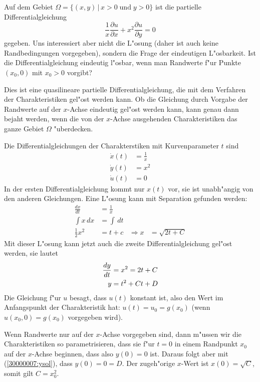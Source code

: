 Auf dem Gebiet $\Omega = \{ (x,y)\,|\, x>0\;\text{und}\;y > 0\}$
ist die partielle Differentialgleichung
\begin{equation}
\frac1x\frac{\partial u}{\partial x}+x^2\frac{\partial u}{\partial y}=0
\label{30000007:pdgl}
\end{equation}
gegeben. Uns interessiert aber nicht die L"osung (daher ist auch keine
Randbedingungen vorgegeben), sondern die Frage der eindeutigen L"osbarkeit.
Ist die Differentialgleichung eindeutig l"osbar, wenn man Randwerte 
f"ur Punkte $(x_0,0)$ mit $x_0>0$ vorgibt?

\begin{loesung}
Dies ist eine quasilineare partielle Differentialgleichung, die mit
dem Verfahren der Charakteristiken gel"ost werden kann. Ob die Gleichung
durch Vorgabe der Randwerte auf der $x$-Achse eindeutig gel"ost werden
kann, kann genau dann bejaht werden, wenn die von der $x$-Achse
ausgehenden Charakteristiken das ganze Gebiet $\Omega$
"uberdecken.

Die Differentialgleichungen der Charakterstiken mit Kurvenparameter $t$ sind 
\begin{align*}
\dot x(t)&=\frac1x\\
\dot y(t)&=x^2\\
\dot u(t)&=0
\end{align*}
In der ersten Differentialgleichung kommt nur $x(t)$ vor, sie ist unabh"angig
von den anderen Gleichungen. Eine L"osung kann mit Separation gefunden werden:
\begin{align*}
\frac{dx}{dt}&=\frac1x\\
\int x\,dx&=\int \,dt\\
\frac12x^2&= t + c&\Rightarrow x&=\sqrt{2t + C}
\end{align*}
Mit dieser L"osung kann jetzt auch die zweite Differentialgleichung
gel"ost werden, sie lautet
\begin{align}
\frac{dy}{dt}&=x^2=2t+C \notag \\
y&=t^2+Ct + D \label{30000007:ysol}
\end{align}
Die Gleichung f"ur $u$ besagt, dass $u(t)$ konstant ist, also den
Wert im Anfangspunkt der Charakteristik hat: $u(t)=u_0=g(x_0)$ (wenn
$u(x_0,0)=g(x_0)$ vorgegeben wird).

Wenn Randwerte nur auf der $x$-Achse vorgegeben sind, dann m"ussen
wir die Charakteristiken so parametrisieren, dass sie f"ur $t=0$
in einem Randpunkt $x_0$ auf der $x$-Achse beginnen, dass also
$y(0)=0$ ist. Daraus folgt aber mit (\ref{30000007:ysol}), dass
$y(0)=0=D$. Der zugeh"orige $x$-Wert ist $x(0)=\sqrt{C}$, somit
gilt $C=x_0^2$.


\end{loesung}
